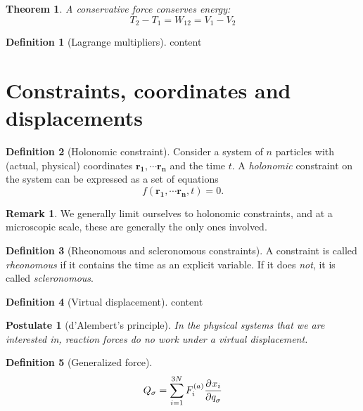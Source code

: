 \documentclass[]{article}
\newtheorem{theorem}{Theorem}
\newtheorem{postulate}{Postulate}
\theoremstyle{definition}
\newtheorem{definition}{Definition}
\newtheorem{remark}{Remark}
\begin{document}
\begin{theorem}
	A conservative force conserves energy:
	\begin{equation*}
		T_2 - T_1 = W_{12} = V_1 - V_2
	\end{equation*}
\end{theorem}

\begin{definition}[Lagrange multipliers]
	content
\end{definition}

\section{Constraints, coordinates and displacements}
\begin{definition}[Holonomic constraint]
	Consider a system of $n$ particles with (actual, physical) coordinates $\mathbf{r_1}, \cdots \mathbf{r_n}$ and the time $t$. A \emph{holonomic} constraint on the system can be expressed as a set of equations
	\begin{equation*}
		f(\mathbf{r_1}, \cdots \mathbf{r_n}, t) = 0.
	\end{equation*}
\end{definition}

\begin{remark}
	We generally limit ourselves to holonomic constraints, and at a microscopic scale, these are generally the only ones involved.
\end{remark}

\begin{definition}[Rheonomous and scleronomous constraints]
	A constraint is called \emph{rheonomous} if it contains the time as an explicit variable. If it does \emph{not}, it is called \emph{scleronomous}.
\end{definition}

\begin{definition}[Virtual displacement]
	content
\end{definition}

\begin{postulate}[d'Alembert's principle]
	In the physical systems that we are interested in, reaction forces do no work under a virtual displacement.
\end{postulate}

\begin{definition}[Generalized force]
	\begin{equation*}
		Q_\sigma = \sum_{i=1}^{3N} F_i^{(a)} \frac{\partial^{} x_i}{\partial q_\sigma ^{}}
	\end{equation*}
\end{definition}
\end{document}
